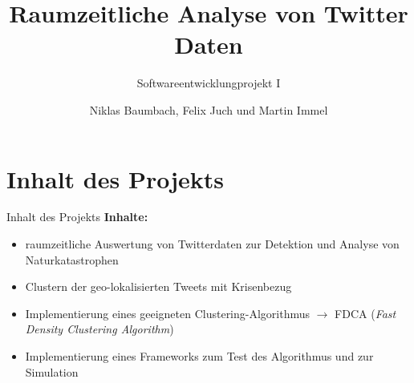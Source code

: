 \documentclass[12pt, xcolor={usenames,dvipsnames,svgnames,x11names,table}]{beamer}
\title{Raumzeitliche Analyse von Twitter Daten}
\subtitle{Softwareentwicklungprojekt I}
\author{Niklas Baumbach, Felix Juch und Martin Immel}
\date{}
\begin{document}
	\begin{frame}
	 	\titlepage
	\end{frame}	
	
	
	\section{Inhalt des Projekts}
	\begin{frame}{Inhalt des Projekts}{}
		\textbf{Inhalte:}\\
		\begin{itemize}
			\item raumzeitliche Auswertung von Twitterdaten zur Detektion und Analyse von Naturkatastrophen
			\item Clustern der geo-lokalisierten Tweets mit Krisenbezug
			\item Implementierung eines geeigneten Clustering-Algorithmus $\rightarrow$ FDCA (\textit{Fast Density Clustering Algorithm})
			\item Implementierung eines Frameworks zum Test des Algorithmus und zur Simulation
		\end{itemize}
	\end{frame}
	
	
\end{document}
